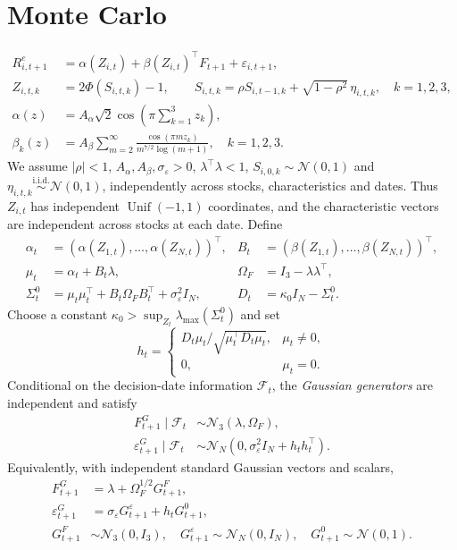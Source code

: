 \section{Monte Carlo}
\label{sec:simulations}
\begin{align*}
R^e_{i,t+1}&=\alpha(Z_{i,t})+\beta(Z_{i,t})^\top F_{t+1}+\varepsilon_{i,t+1},\\
Z_{i,t,k}&=2\Phi(S_{i,t,k})-1,\qquad
S_{i,t,k}=\rho S_{i,t-1,k}+\sqrt{1-\rho^2}\,\eta_{i,t,k},\quad k=1,2,3,\\
\alpha(z)&=A_\alpha\sqrt2\cos\left(\pi\sum_{k=1}^3z_k\right),\\
\beta_k(z)&=A_\beta\sum_{m=2}^\infty\frac{\cos(\pi m z_k)}{m^{7/2}\log(m+1)},\quad k=1,2,3.
\end{align*}
We assume $|\rho|<1$, $A_\alpha,A_\beta,\sigma_\varepsilon>0$, $\lambda^\top\lambda<1$,
$S_{i,0,k}\sim\mathcal N(0,1)$ and $\eta_{i,t,k}\overset{\mathrm{i.i.d.}}\sim\mathcal N(0,1)$,
independently across stocks, characteristics and dates. Thus $Z_{i,t}$ has independent
$\operatorname{Unif}(-1,1)$ coordinates, and the characteristic vectors are independent
across stocks at each date. Define
\begin{align*}
\alpha_t&=(\alpha(Z_{1,t}),\ldots,\alpha(Z_{N,t}))^\top,
&B_t&=(\beta(Z_{1,t}),\ldots,\beta(Z_{N,t}))^\top,\\
\mu_t&=\alpha_t+B_t\lambda,
&\Omega_F&=I_3-\lambda\lambda^\top,\\
\Sigma_t^0&=\mu_t\mu_t^\top+B_t\Omega_FB_t^\top+\sigma_\varepsilon^2I_N,
&D_t&=\kappa_0 I_N-\Sigma_t^0.
\end{align*}
Choose a constant $\kappa_0>\sup_{Z_t}\lambda_{\max}(\Sigma_t^0)$ and set
\[
h_t=\begin{cases}
D_t\mu_t/\sqrt{\mu_t^\top D_t\mu_t},&\mu_t\neq0,\\
0,&\mu_t=0.
\end{cases}
\]
Conditional on the decision-date information $\mathscr F_t$, the \emph{Gaussian generators}
are independent and satisfy
\begin{align*}
F^G_{t+1}\mid\mathscr F_t&\sim\mathcal N_3(\lambda,\Omega_F),\\
\varepsilon^G_{t+1}\mid\mathscr F_t&\sim
\mathcal N_N(0,\sigma_\varepsilon^2I_N+h_th_t^\top).
\end{align*}
Equivalently, with independent standard Gaussian vectors and scalars,
\begin{align*}
F^G_{t+1}&=\lambda+\Omega_F^{1/2}G^F_{t+1},\\
\varepsilon^G_{t+1}&=\sigma_\varepsilon G^\varepsilon_{t+1}+h_tG^0_{t+1},\\
G^F_{t+1}&\sim\mathcal N_3(0,I_3),\quad
G^\varepsilon_{t+1}\sim\mathcal N_N(0,I_N),\quad
G^0_{t+1}\sim\mathcal N(0,1).
\end{align*}
